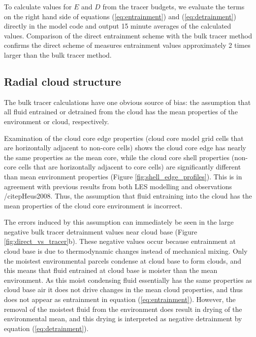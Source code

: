 \documentclass[draft,grl]{AGUTeX}
\begin{document}
\begin{article}
To calculate values for $E$ and $D$ from the tracer budgets, we evaluate the 
terms on the right hand side of equations (\ref{eq:entrainment}) and 
(\ref{eq:detrainment}) directly in the model code and output 15 minute averages 
of the calculated values.  Comparison of the direct entrainment scheme with the 
bulk tracer method confirms the direct scheme of \cite{Romps2010} measures 
entrainment values approximately 2 times larger than the bulk tracer method.



\subsection{Radial cloud structure}

The bulk tracer calculations have one obvious source of bias: the assumption 
that all fluid entrained or detrained from the cloud has the mean properties of 
the environment or cloud, respectively.  

Examination of the cloud core edge properties (cloud core model grid cells 
that are horizontally adjacent to non-core cells) shows the cloud core edge has 
nearly the same properties as the mean core, while the cloud core shell 
properties (non-core cells that are horizontally adjacent to core cells) 
are significantly different than mean environment properties (Figure 
\ref{fig:shell_edge_profiles}).  This is in agreement with previous results 
from both LES modelling and observations /citep{Heus2008}.  Thus, the 
assumption that fluid entraining into the cloud has the mean properties of the 
cloud core environment is incorrect.  





The errors induced by this assumption 
can immediately be seen in the large negative bulk tracer detrainment values 
near cloud base (Figure \ref{fig:direct_vs_tracer}b).  These negative values 
occur because entrainment at cloud base is due to thermodynamic changes instead 
of mechanical mixing.  Only the moistest environmental parcels condense at 
cloud base to form clouds, and this means that fluid entrained at cloud base is 
moister than the mean environment.  As this moist condensing fluid essentially 
has the same properties as cloud base air it does not drive changes in the mean 
cloud properties, and thus does not appear as entrainment in equation 
(\ref{eq:entrainment}).  However, the removal of the moistest fluid from the 
environment does result in drying of the environmental mean, and this drying is 
interpreted as negative detrainment by equation (\ref{eq:detrainment}).


\end{article}
\end{document}
